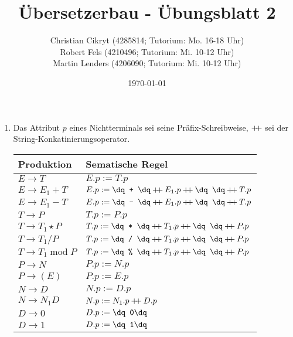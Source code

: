 \documentclass[a4paper,10pt]{scrartcl}
\title{Übersetzerbau - Übungsblatt 2}
\author{Christian Cikryt (4285814; Tutorium: Mo. 16-18 Uhr)\\
  Robert Fels (4210496; Tutorium: Mi. 10-12 Uhr)\\
  Martin Lenders (4206090; Tutorium: Mi. 10-12 Uhr)
  }
\date{\today}
\begin{document}
\maketitle

\section{}
\newcommand{\str}[1]{\texttt{\dq #1\dq}}
\newcommand{\print}[1]{\{\texttt{print(\dq #1\dq})\}}
\newcommand\dplus{\ensuremath{\mathbin{+\mkern-50mu+}}}
\newcommand\concat{\ensuremath{\mathbin{+\mkern-5mu+}}}
\begin{enumerate}
 \item  Das Attribut $p$ eines Nichtterminals sei seine Präfix-Schreibweise, $\concat$ sei der String-Konkatinierungsoperator.
        \begin{center}
            \begin{tabular}{l|l}
                \textbf{Produktion} & \textbf{Sematische Regel} \\\hline
                $E \to T$                       & $E.p := T.p$ \\
                $E \to E_1 + T$                 & $E.p := \str{+ } \concat E_1.p \concat \str{ } \concat T.p$ \\
                $E \to E_1 - T$                 & $E.p := \str{- } \concat E_1.p \concat \str{ } \concat T.p$ \\
                $T \to P$                       & $T.p := P.p$ \\
                $T \to T_1 \star P$             & $T.p := \str{* } \concat T_1.p \concat \str{ } \concat P.p$\\
                $T \to T_1 / P$                 & $T.p := \str{/ } \concat T_1.p \concat \str{ } \concat P.p$\\
                $T \to T_1 \operatorname{mod} P$& $T.p := \str{\% } \concat T_1.p \concat \str{ } \concat P.p$\\
                $P \to N$                       & $P.p := N.p$\\
                $P \to (E)$                     & $P.p := E.p$\\
                $N \to D$                       & $N.p := D.p$\\
                $N \to N_1D$                    & $N.p := N_1.p \concat D.p$\\
                $D \to 0$                       & $D.p := \str{0}$\\
                $D \to 1$                       & $D.p := \str{1}$\\

\end{tabular}
\end{center}
\end{enumerate}
\end{document}
